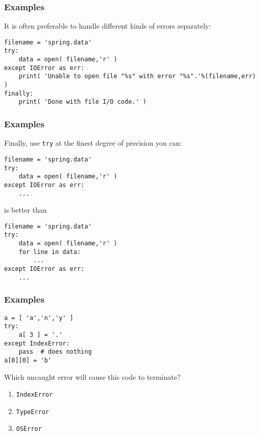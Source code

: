 \documentclass[11pt]{beamer}
\begin{document}
\begin{frame}[fragile]
  \frametitle{Examples}
  \Enlarge

  \begin{enumerate}
  \myitem  It is often preferable to handle different kinds of errors separately:
  \end{enumerate}

  \begin{Verbatim}
filename = 'spring.data'
try:
    data = open( filename,'r' )
except IOError as err:
    print( 'Unable to open file "%s" with error "%s".'%(filename,err) )
finally:
    print( 'Done with file I/O code.' )
  \end{Verbatim}
\end{frame}

\begin{frame}[fragile]
  \frametitle{Examples}
  \Enlarge

  \begin{enumerate}
  \myitem  Finally, use \texttt{try} at the finest degree of precision you can:
  \end{enumerate}

  \begin{Verbatim}
filename = 'spring.data'
try:
    data = open( filename,'r' )
except IOError as err:
    ...
  \end{Verbatim}

  is better than

  \begin{Verbatim}
filename = 'spring.data'
try:
    data = open( filename,'r' )
    for line in data:
        ...
except IOError as err:
    ...
  \end{Verbatim}
\end{frame}

\begin{frame}[fragile]
  \frametitle{Examples}
  \Enlarge

  \begin{Verbatim}
a = [ 'a','n','y' ]
try:
    a[ 3 ] = '.'
except IndexError:
    pass  # does nothing
a[0][0] = 'b'
  \end{Verbatim}

  Which uncaught error will cause this code to terminate?

  \begin{enumerate}[label=\Alph*]
    \item  \texttt{IndexError}
    \item  \texttt{TypeError}
    \item  \texttt{OSError}
  \end{enumerate}
\end{frame}
\end{document}
